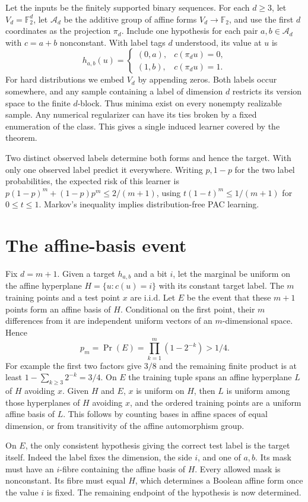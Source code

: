 \documentclass[11pt]{article}
\newcommand{\F}{\mathbb F_2}
\newcommand{\Aff}{\mathcal A}
\begin{document}
Let the inputs be the finitely supported binary sequences. For each $d\ge3$, let $V_d=\F^d$, let $\Aff_d$ be the additive group of affine forms $V_d\to\F$, and use the first $d$ coordinates as the projection $\pi_d$. Include one hypothesis for each pair $a,b\in\Aff_d$ with $c=a+b$ nonconstant. With label tags $d$ understood, its value at $u$ is
\[
 h_{a,b}(u)=
 \begin{cases}
 (0,a),&c(\pi_d u)=0,\\
 (1,b),&c(\pi_d u)=1.
 \end{cases}
\]
For hard distributions we embed $V_d$ by appending zeros. Both labels occur somewhere, and any sample containing a label of dimension $d$ restricts its version space to the finite $d$-block. Thus minima exist on every nonempty realizable sample. Any numerical regularizer can have its ties broken by a fixed enumeration of the class. This gives a single induced learner covered by the theorem.

Two distinct observed labels determine both forms and hence the target. With only one observed label predict it everywhere. Writing $p,1-p$ for the two label probabilities, the expected risk of this learner is
$p(1-p)^m+(1-p)p^m\le 2/(m+1)$, using $t(1-t)^m\le1/(m+1)$ for $0\le t\le1$. Markov's inequality implies distribution-free PAC learning.

\section{The affine-basis event}
Fix $d=m+1$. Given a target $h_{a,b}$ and a bit $i$, let the marginal be uniform on the affine hyperplane $H=\{u:c(u)=i\}$ with its constant target label. The $m$ training points and a test point $x$ are i.i.d. Let $E$ be the event that these $m+1$ points form an affine basis of $H$. Conditional on the first point, their $m$ differences from it are independent uniform vectors of an $m$-dimensional space. Hence
\[
 p_m=\Pr(E)=\prod_{k=1}^m(1-2^{-k})>1/4.
\]
For example the first two factors give $3/8$ and the remaining finite product is at least $1-\sum_{k\ge3}2^{-k}=3/4$. On $E$ the training tuple spans an affine hyperplane $L$ of $H$ avoiding $x$. Given $H$ and $E$, $x$ is uniform on $H$, then $L$ is uniform among those hyperplanes of $H$ avoiding $x$, and the ordered training points are a uniform affine basis of $L$. This follows by counting bases in affine spaces of equal dimension, or from transitivity of the affine automorphism group.

On $E$, the only consistent hypothesis giving the correct test label is the target itself. Indeed the label fixes the dimension, the side $i$, and one of $a,b$. Its mask must have an $i$-fibre containing the affine basis of $H$. Every allowed mask is nonconstant. Its fibre must equal $H$, which determines a Boolean affine form once the value $i$ is fixed. The remaining endpoint of the hypothesis is now determined.
\end{document}
